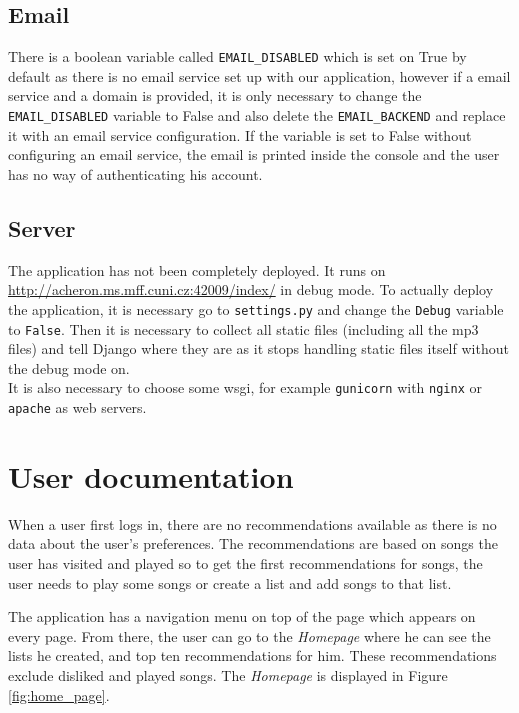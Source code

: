 \subsection{Email}
There is a boolean variable called \texttt{EMAIL\_DISABLED} which is set on True by default as there is no email service set up with our application, however if a email service and a domain is provided, it is only necessary to change the \texttt{EMAIL\_DISABLED} variable to False and also delete the \texttt{EMAIL\_BACKEND} and replace it with an email service configuration. If the variable is set to False without configuring an email service, the email is printed inside the console and the user has no way of authenticating his account.

\subsection{Server}

The application has not been completely deployed. It runs on \url{http://acheron.ms.mff.cuni.cz:42009/index/} in debug mode. To actually deploy the application, it is necessary go to \texttt{settings.py} and change the \texttt{Debug} variable to \texttt{False}. Then it is necessary to collect all static files (including all the mp3 files) and tell Django where they are as it stops handling static files itself without the debug mode on.\\
It is also necessary to choose some wsgi, for example \texttt{gunicorn} with \texttt{nginx} or \texttt{apache} as web servers.

\section*{User documentation}\label{sec:user_docs}
When a user first logs in, there are no recommendations available as there is no data about the user's preferences. The recommendations are based on songs the user has visited and played so to get the first recommendations for songs, the user needs to play some songs or create a list and add songs to that list. 

The application has a navigation menu on top of the page which appears on every page. From there, the user can go to the \textit{Homepage} where he can see the lists he created, and top ten recommendations for him. These recommendations exclude disliked and played songs. The \textit{Homepage} is displayed in Figure \ref{fig:home_page}. \\


